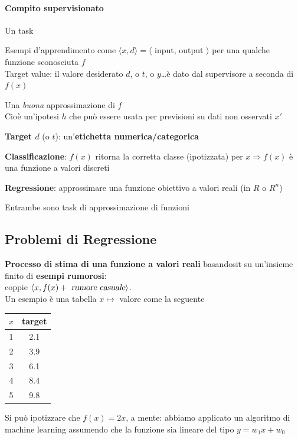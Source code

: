 \documentclass[10pt]{book}
\begin{document}
\paragraph{Compito supervisionato} Un task\\ \begin{list}{}{\textbf{Dati}}
	\item Esempi d'apprendimento come $\langle x, d\rangle = \langle$ input, output $\rangle$ per una qualche funzione sconosciuta $f$\\
	Target value: il valore desiderato $d$, o $t$, o $y$\ldots è dato dal supervisore a seconda di $f(x)$
\end{list}
\begin{list}{}{\textbf{Trovare}}
	\item Una \textit{buona} approssimazione di $f$\\
	Cioè un'ipotesi $h$ che può essere usata per previsioni su dati non osservati $x'$
\end{list}\textbf{Target $d$} (o $t$): un'\textbf{etichetta numerica/categorica}
\begin{list}{}{}
	\item \textbf{Classificazione}: $f(x)$ ritorna la corretta classe (ipotizzata) per $x \Rightarrow f(x)$ è una funzione a valori discreti
	\item \textbf{Regressione}: approssimare una funzione obiettivo a valori reali (in $R$ o $R^n$)
	\item Entrambe sono task di approssimazione di funzioni
\end{list}
\subsection{Problemi di Regressione}
\textbf{Processo di stima di una funzione a valori reali} basandosit su un'insieme finito di \textbf{esempi rumorosi}:\\coppie $\langle x, f(x) + \textsl{ rumore casuale}\rangle$.\\Un esempio è una tabella $x \mapsto$ valore come la seguente
\begin{multicols}{2}
\begin{center}
\begin{tabular}{c | c}
	$x$ & target\\
	\hline
	1 & 2.1\\
	2 & 3.9\\
	3 & 6.1\\
	4 & 8.4\\
	5 & 9.8
\end{tabular}
\end{center}
Si può ipotizzare che $f(x) = 2x$, a mente: abbiamo applicato un algoritmo di machine learning assumendo che la funzione sia lineare del tipo $y = w_1x + w_0$
\end{multicols}
\end{document}
